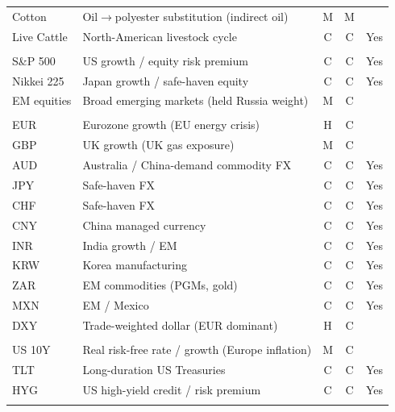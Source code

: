 \begin{table}[h]
\begin{threeparttable}
\begin{tabular}{@{}llccc@{}}
Cotton      & Oil$\to$polyester substitution (indirect oil)  & M & M & \\
Live Cattle & North-American livestock cycle                 & C & C & Yes \\
\addlinespace
\multicolumn{5}{@{}l}{\textit{Equities}}\\
S\&P 500    & US growth / equity risk premium                & C & C & Yes \\
Nikkei 225  & Japan growth / safe-haven equity               & C & C & Yes \\
EM equities & Broad emerging markets (held Russia weight)    & M & C & \\
\addlinespace
\multicolumn{5}{@{}l}{\textit{Foreign exchange}}\\
EUR         & Eurozone growth (EU energy crisis)             & H & C & \\
GBP         & UK growth (UK gas exposure)                    & M & C & \\
AUD         & Australia / China-demand commodity FX          & C & C & Yes \\
JPY         & Safe-haven FX                                  & C & C & Yes \\
CHF         & Safe-haven FX                                  & C & C & Yes \\
CNY         & China managed currency                         & C & C & Yes \\
INR         & India growth / EM                              & C & C & Yes \\
KRW         & Korea manufacturing                            & C & C & Yes \\
ZAR         & EM commodities (PGMs, gold)                    & C & C & Yes \\
MXN         & EM / Mexico                                    & C & C & Yes \\
DXY         & Trade-weighted dollar (EUR dominant)           & H & C & \\
\addlinespace
\multicolumn{5}{@{}l}{\textit{Rates \& credit}}\\
US 10Y      & Real risk-free rate / growth (Europe inflation)& M & C & \\
TLT         & Long-duration US Treasuries                    & C & C & Yes \\
HYG         & US high-yield credit / risk premium            & C & C & Yes \\
\addlinespace
\multicolumn{5}{@{}l}{\textit{Volatility}}\\

\end{tabular}
\end{threeparttable}
\end{table}
